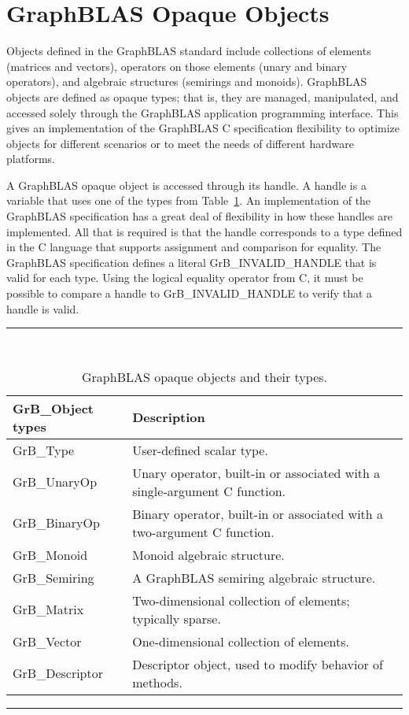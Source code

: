 \section{GraphBLAS Opaque Objects}

Objects defined in the GraphBLAS standard include collections of elements
(matrices and vectors), operators on those elements (unary and binary operators), and 
algebraic structures (semirings and monoids).   GraphBLAS objects are defined
as opaque types; that is, they are managed, manipulated, and accessed solely through the
GraphBLAS application programming interface. This gives an implementation of the
GraphBLAS C specification flexibility to optimize objects for different scenarios or to meet
the needs of different hardware platforms.

A GraphBLAS opaque object is accessed through its handle.  A handle
is a variable that uses one of the types from Table~\ref{Tab:ObjTypes}.  An implementation 
of the GraphBLAS specification has a great deal of flexibility in how these
handles are implemented.  All that is required is that the handle corresponds to a type defined in the 
C language that supports assignment and comparison for equality.  The
GraphBLAS specification defines a 
literal {\sf GrB\_INVALID\_HANDLE} that is valid for each type.  Using the logical equality 
operator from C, it must be possible to compare a handle to {\sf GrB\_INVALID\_HANDLE}
to verify that a handle is valid.


\begin{table}
\hrule
\begin{center}
\caption{GraphBLAS opaque objects and their types.}
\label{Tab:ObjTypes}
~\\
\begin{tabular}{l|l}
{\sf GrB\_Object types} & Description \\
\hline
{\sf GrB\_Type}           & User-defined scalar type.     \\
{\sf GrB\_UnaryOp}        & Unary operator, built-in or associated with a single-argument C function.     \\
{\sf GrB\_BinaryOp}       & Binary operator, built-in or associated with a two-argument C function.     \\
{\sf GrB\_Monoid}         & Monoid algebraic structure.     \\
{\sf GrB\_Semiring}       & A GraphBLAS semiring algebraic structure.     \\
{\sf GrB\_Matrix}         & Two-dimensional collection of elements; typically sparse.    \\
{\sf GrB\_Vector}         & One-dimensional collection of elements.     \\
{\sf GrB\_Descriptor}     & Descriptor object, used to modify behavior of methods.     \\
\end{tabular}
\end{center}
\hrule
\end{table}

